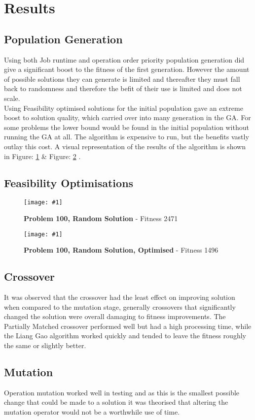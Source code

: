 \documentclass[14pt]{acmsiggraph}
\newcommand{\figuremacroW}[4]{
	\begin{figure}[h] %
		\centering
		\texttt{[image: \#1]}
		\caption[#2]{\textbf{#2} - #3}
		\label{fig:#1}
	\end{figure}
}
\begin{document}
	\section{Results}
	\subsection{Population Generation}
		Using both Job runtime and operation order priority population generation did give a significant boost to the fitness of the first generation. However the amount of possible solutions they can generate is limited and thereafter they must fall back to randomness and therefore the befit of their use is limited and does not scale.\\
		Using Feasibility optimised solutions for the initial population gave an extreme boost to solution quality, which carried over into many generation in the GA. For some problems the lower bound would be found in the initial population without running the GA at all. The algorithm is expensive to run, but the benefits vastly outlay this cost. A visual representation of the results of the algorithm is shown in Figure: \ref{fig:p100rnd} \& Figure: \ref{fig:p100rndopt} .
	
	\subsection{Feasibility Optimisations}
	\figuremacroW
	{p100rnd}
	{Problem 100, Random Solution}
	{Fitness 2471}
	{1.0}
	\figuremacroW
	{p100rndopt}
	{Problem 100, Random Solution, Optimised}
	{Fitness 1496}
	{1.0}
	
	\subsection{Crossover}
	It was observed that the crossover had the least effect on improving solution when compared to the mutation stage, generally crossovers that significantly changed the solution were overall damaging to fitness improvements. The Partially Matched crossover performed well but had a high processing time, while the Liang Gao algorithm worked quickly and tended to leave the fitness roughly the same or slightly better.
	
	\subsection{Mutation}
	Operation mutation worked well in testing and as this is the smallest possible change that could be made to a solution it was theorised that altering the mutation operator would not be a worthwhile use of time.
	
\end{document}
